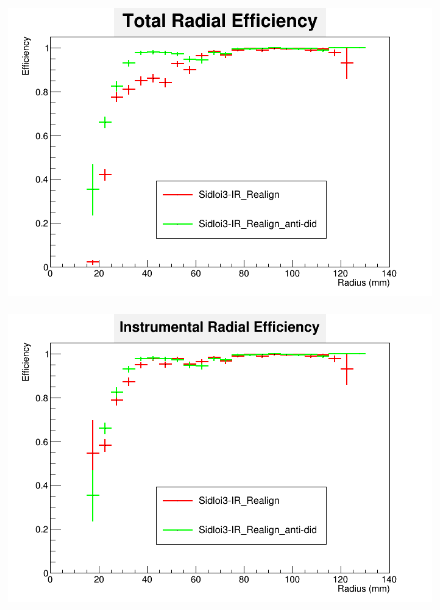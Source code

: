 \documentclass{report}
\begin{document}
                \begin{figure}[H] 
                    \includegraphics[width=\textwidth]{RadialEfficiency_total_did}
                    \centering
                    \caption{}
                    \label{fig__did_beamcal_total}
                \end{figure}
                \begin{figure}[H]
                    \includegraphics[width=\textwidth]{RadialEfficiency_instrumental_did}
                    \centering
                    \caption{}
                    \label{fig__did_beamcal_inst}
                \end{figure}
\end{document}
